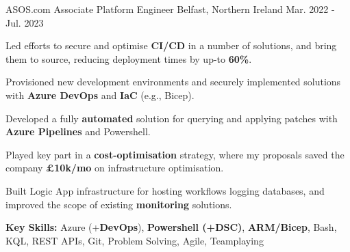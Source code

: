 \begin{cventries}
  \cventry
  	{ASOS.com} %
    {Associate Platform Engineer} %
    {Belfast, Northern Ireland} %
    {Mar. 2022 - Jul. 2023} %
    {
      \begin{cvitems} %
        \item {Led efforts to secure and optimise \textbf{CI/CD} in a number of solutions, and bring them to source, reducing deployment times by up-to \textbf{60\%}.}
        \item {Provisioned new development environments and securely implemented solutions with \textbf{Azure DevOps} and \textbf{IaC} (e.g., Bicep).}
        \item {Developed a fully \textbf{automated} solution for querying and applying patches with \textbf{Azure Pipelines} and Powershell.}
        \item {Played key part in a \textbf{cost-optimisation} strategy, where my proposals saved the company \textbf{\approx £10k/mo} on infrastructure optimisation.}
		\item {Built Logic App infrastructure for hosting workflows logging databases, and improved the scope of existing \textbf{monitoring} solutions.}
        \item {\textbf{Key Skills:} Azure (+\textbf{DevOps}), \textbf{Powershell (+DSC)}, \textbf{ARM/Bicep}, Bash, KQL, REST APIs, Git, Problem Solving, Agile, Teamplaying}
      \end{cvitems}
    }


\end{cventries}
